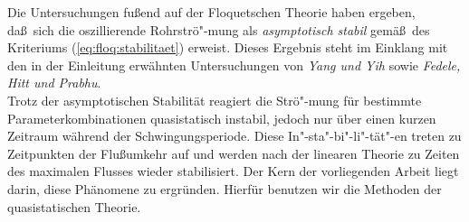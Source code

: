 \documentclass[10pt,a5paper,oneside,draft]{book}
\numberwithin{equation}{chapter}
\begin{document}
Die Untersuchungen fu\ss end auf der Floquetschen Theorie haben ergeben, da\ss\ sich die oszillierende Rohrstr\"o"-mung als \textit{asymptotisch stabil} gem\"a\ss\ des Kriteriums (\mbox{\ref{eq:floq:stabilitaet}}) erweist.
Dieses Ergebnis steht im Einklang mit den in der Einleitung erw\"ahnten Untersuchungen von \textsl{Yang und Yih} sowie \textsl{Fedele, Hitt und Prabhu}.\\

Trotz der asymptotischen Stabilit\"at reagiert die Str\"o"-mung f\"ur bestimmte Parameterkombinationen quasistatisch instabil, jedoch nur \"uber einen kurzen Zeitraum w\"ahrend der Schwingungsperiode.
Diese In"-sta"-bi"-li"-t\"at"-en treten zu Zeitpunkten der Flu\ss umkehr auf und werden nach der linearen Theorie zu Zeiten des maximalen Flusses wieder stabilisiert.
Der Kern der vorliegenden Arbeit liegt darin, diese Ph\"anomene zu ergr\"unden.
Hierf\"ur benutzen wir die Methoden der quasistatischen Theorie.\\
\end{document}

